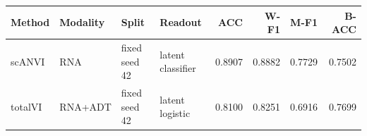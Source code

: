 \begin{tabular}{llllrrrr}
\toprule
Method & Modality & Split & Readout & ACC & W-F1 & M-F1 & B-ACC \\
\midrule
scANVI & RNA & fixed seed 42 & latent classifier & 0.8907 & 0.8882 & 0.7729 & 0.7502 \\
totalVI & RNA+ADT & fixed seed 42 & latent logistic & 0.8100 & 0.8251 & 0.6916 & 0.7699 \\
\bottomrule
\end{tabular}
